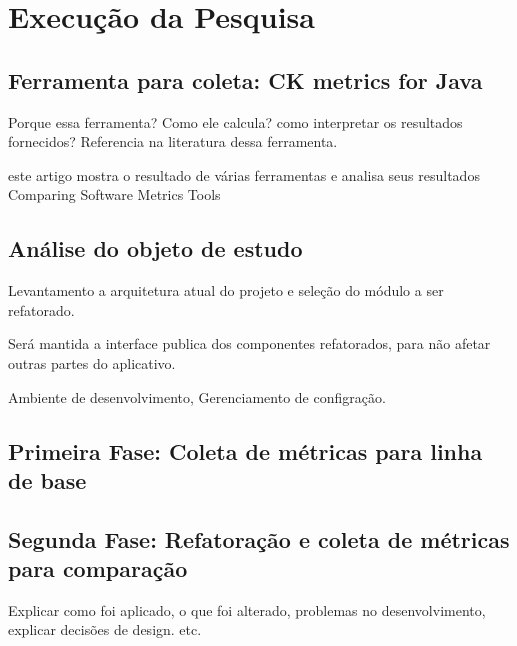 \chapter{Execução da Pesquisa}

\section{Ferramenta para coleta: CK metrics for Java}

Porque essa ferramenta?
Como ele calcula? como interpretar os resultados fornecidos?
Referencia na literatura dessa ferramenta.

este artigo mostra o resultado de várias ferramentas e analisa seus resultados 
Comparing Software Metrics Tools

\section{Análise do objeto de estudo}

Levantamento a arquitetura atual do projeto e seleção do módulo a ser
refatorado.

Será mantida a interface publica dos componentes refatorados, para não afetar
outras partes do aplicativo.


Ambiente de desenvolvimento, Gerenciamento de configração.

\section{Primeira Fase: Coleta de métricas para linha de base}



\section{Segunda Fase: Refatoração e coleta de métricas para comparação}

Explicar como foi aplicado, o que foi alterado, problemas no desenvolvimento,
explicar decisões de design. etc.
